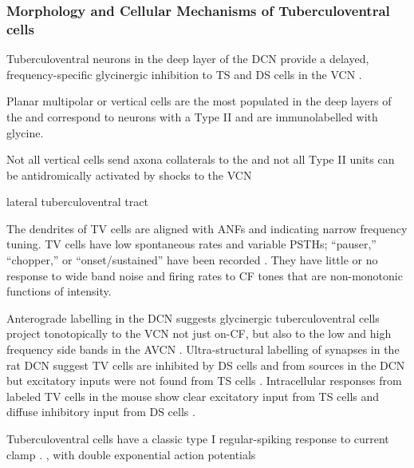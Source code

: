 

\subsubsection{Morphology and Cellular Mechanisms of Tuberculoventral cells}

Tuberculoventral neurons in the deep layer of the DCN provide a delayed, frequency-specific
glycinergic inhibition to TS and DS cells in the VCN
\citep{ZhangOertel:1993,WickesbergOertel:1988}.  

Planar multipolar or vertical cells are the most populated in the deep layers of the \DCN
and correspond to neurons with a Type II \EIRA \citep{Rhode:1999} and are immunolabelled with glycine.

Not all vertical cells send axona collaterals to the \VCN \citep{Rhode:1999} and not all Type II units can be antidromically activated by shocks to the VCN

lateral tuberculoventral tract


The dendrites of TV cells are
aligned with ANFs and indicating narrow frequency tuning. TV cells have low
spontaneous rates and variable PSTHs; “pauser,” “chopper,” or “onset/sustained”
have been recorded \citep{ShofnerYoung:1985,SpirouDavisEtAl:1999}. They have
little or no response to wide band noise and firing rates to CF tones that are
non-monotonic functions of intensity.

Anterograde labelling in the DCN suggests glycinergic tuberculoventral cells
project tonotopically to the VCN not just on-CF, but also to the low and high
frequency side bands in the AVCN
\citep{OstapoffFengEtAl:1994,MunirathinamOstapoffEtAl:2004}.  Ultra-structural
labelling of synapses in the rat DCN suggest TV cells are inhibited by DS cells
and from sources in the DCN but excitatory inputs were not found from TS cells
\citep{RubioJuiz:2004}.  Intracellular responses from labeled TV cells in the mouse
show clear excitatory input from TS cells and diffuse inhibitory input from DS
cells \citep{ZhangOertel:1993}.


Tuberculoventral cells have a classic type I regular-spiking response to current clamp 
\citep{ZhangOertel:1993}. , with double exponential action potentials 

